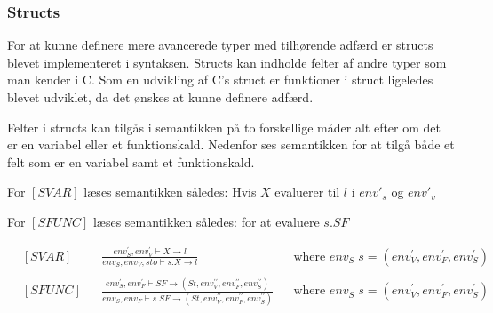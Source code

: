 \subsubsection*{Structs}
For at kunne definere mere avancerede typer med tilhørende adfærd er structs blevet implementeret i syntaksen. Structs kan indholde felter af andre typer som man kender i C. Som en udvikling af C's struct er funktioner i struct ligeledes blevet udviklet, da det ønskes at kunne definere adfærd.

Felter i structs kan tilgås i semantikken på to forskellige måder alt efter om det er en variabel eller et funktionskald. Nedenfor ses semantikken for at tilgå både et felt som er en variabel samt et funktionskald.

For $[SVAR]$ læses semantikken således:
Hvis $X$ evaluerer til $l$ i $env'_s$ og $env'_v$



For $[SFUNC]$ læses semantikken således: for at evaluere $s.SF$

\begin{align*}
&[SVAR] & &\frac{env_S^\prime, env_V^\prime \vdash X \rightarrow l}{env_S, env_V, sto \vdash s.X \rightarrow l} & &\text{where } env_S\; s = (env_V^\prime, env_F^\prime, env_S^\prime)\\\\
&[SFUNC] & &\frac{env_S^\prime, env_F^\prime \vdash SF \rightarrow (St, env_V^{\prime\prime}, env_F^{\prime\prime}, env_S^{\prime\prime})}{env_S, env_F \vdash s.SF \rightarrow (St, env_V^{\prime\prime}, env_F^{\prime\prime}, env_S^{\prime\prime})} & &\text{where } env_S\; s = (env_V^\prime, env_F^\prime, env_S^\prime)
\end{align*}